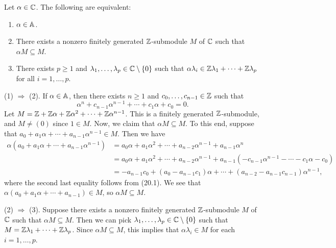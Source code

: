 \begin{theo}{}
    Let $\alpha \in \mathbb{C}$. The following are equivalent: 
    \begin{enumerate}[(1)]
        \item $\alpha \in \mathbb{A}$. 
        \item There exists a nonzero finitely generated $\mathbb{Z}$-submodule $M$ of 
              $\mathbb{C}$ such that $\alpha M \subseteq M$. 
        \item There exists $p \geq 1$ and $\lambda_1, \dots, \lambda_p \in 
              \mathbb{C} \setminus \{0\}$ such that $\alpha \lambda_i \in 
              \mathbb{Z}\lambda_1 + \cdots + \mathbb{Z}\lambda_p$ for all $i = 1, \dots, p$. 
    \end{enumerate}
\end{theo}
\begin{pf}
    (1) $\Rightarrow$ (2). If $\alpha \in \mathbb{A}$, then there exists $n \geq 1$ 
    and $c_0, \dots, c_{n-1} \in \mathbb{Z}$ such that 
    \begin{equation}
        \alpha^n + c_{n-1} \alpha^{n-1} + \cdots + c_1 \alpha + c_0 = 0. 
    \end{equation}
    Let $M = \mathbb{Z} + \mathbb{Z}\alpha + \mathbb{Z}\alpha^2 + \cdots + \mathbb{Z}\alpha^{n-1}$. This is a 
    finitely generated $\mathbb{Z}$-submodule, and $M \neq (0)$ since $1 \in M$. 
    Now, we claim that $\alpha M \subseteq M$. To this end, suppose that 
    $a_0 + a_1 \alpha + \cdots + a_{n-1} \alpha^{n-1} \in M$. Then we have 
    \begin{align*}
        \alpha (a_0 + a_1 \alpha + \cdots + a_{n-1} \alpha^{n-1}) 
        &= a_0 \alpha + a_1 \alpha^2 + \cdots + a_{n-2} \alpha^{n-1} 
        + a_{n-1} \alpha^n \\ 
        &= a_0 \alpha + a_1 \alpha^2 + \cdots + a_{n-2} \alpha^{n-1} 
        + a_{n-1} (- c_{n-1} \alpha^{n-1} - \cdots - c_1 \alpha - c_0) \\ 
        &= -a_{n-1} c_0 + (a_0 - a_{n-1} c_1) \alpha + \cdots + 
        (a_{n-2} - a_{n-1} c_{n-1}) \alpha^{n-1},
    \end{align*}
    where the second last equality follows from (20.1).
    We see that $\alpha(a_0 + a_1 \alpha + \cdots + a_{n-1}) \in M$, so 
    $\alpha M \subseteq M$. 

    (2) $\Rightarrow$ (3). Suppose there exists a nonzero finitely generated 
    $\mathbb{Z}$-submodule $M$ of $\mathbb{C}$ such that $\alpha M \subseteq M$. Then we can 
    pick $\lambda_1, \dots, \lambda_p \in \mathbb{C} \setminus \{0\}$ such that 
    $M = \mathbb{Z}\lambda_1 + \cdots + \mathbb{Z}\lambda_p$. Since $\alpha M \subseteq M$,
    this implies that $\alpha \lambda_i \in M$ for each $i = 1, \dots, p$. 


\end{pf}
